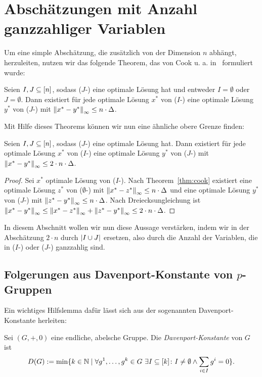 
\section{Abschätzungen mit Anzahl ganzzahliger Variablen}

Um eine simple Abschätzung, die zusätzlich von der Dimension $n$ abhängt, herzuleiten, nutzen wir das folgende Theorem, das von Cook u. a. in~\cite[Theorem 1 und Bemerkung 1]{Cook1986} formuliert wurde:

\begin{theorem}[Cook u. a., 1986]\label{thm:cook}
	Seien $I, J\subseteq[n]$, sodass ($J$-\MIPR) eine optimale Lösung hat und entweder $I=\emptyset$ oder $J=\emptyset$.
	Dann existiert für jede optimale Lösung $x^*$ von ($I$-\MIPR) eine optimale Lösung $y^*$ von ($J$-\MIPR) mit $\left\lVert x^*-y^*\right\rVert_\infty\leq n\cdot\Delta$.
\end{theorem}

Mit Hilfe dieses Theorems können wir nun eine ähnliche obere Grenze finden:
\begin{corollary}
	Seien $I,J\subseteq[n]$, sodass ($J$-\MIPR) eine optimale Lösung
	hat.
	Dann existiert für jede optimale Lösung $x^*$ von ($I$-\MIPR) eine optimale Lösung $y^*$ von ($J$-\MIPR) mit $\left\lVert x^*-y^*\right\rVert_\infty\leq2\cdot n\cdot\Delta$.
\end{corollary}
\begin{proof}
	Sei $x^*$ optimale Lösung von ($I$-\MIPR).
	Nach Theorem~\ref{thm:cook} existiert eine optimale Lösung $z^*$ von ($\emptyset$-\MIPR) mit $\left\lVert x^*-z^*\right\rVert_\infty\leq n\cdot\Delta$ und eine optimale Lösung $y^*$ von ($J$-\MIPR) mit $\left\lVert z^*-y^*\right\rVert_\infty\leq n\cdot\Delta$.
	Nach Dreiecksungleichung ist $\left\lVert x^*-y^*\right\rVert_\infty\leq\left\lVert x^*-z^*\right\rVert_\infty+\left\lVert z^*-y^*\right\rVert_\infty\leq 2\cdot n\cdot\Delta$.
\end{proof}

In diesem Abschnitt wollen wir nun diese Aussage verstärken, indem wir in der Abschätzung $2\cdot n$ durch $\lvert I\cup J \rvert$ ersetzen, also durch die Anzahl der Variablen, die in ($I$-\MIPR) oder ($J$-\MIPR) ganzzahlig sind.

\subsection{Folgerungen aus Davenport-Konstante von $p$-Gruppen}

Ein wichtiges Hilfslemma dafür lässt sich aus der sogenannten Davenport-Konstante herleiten:

\begin{definition}
	Sei $(G,+,0)$ eine endliche, abelsche Gruppe.
	Die {\em Davenport-Konstante} von $G$ ist
	$$
		D(G):=\min\{k\in\mathbb{N} \mid \forall g^1,\dots,g^k \in G~\exists I\subseteq[k]\colon I\neq\emptyset \wedge \sum_{i\in I}g^i=0  \} .
	$$
\end{definition}

